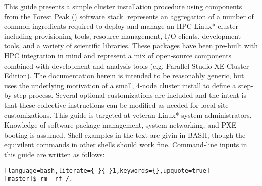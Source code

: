 This guide presents a simple cluster installation procedure using components
from the Forest Peak (\FSP{}) software stack. \FSP{} represents an aggregation of a number of
common ingredients required to deploy and manage an HPC Linux* cluster including
provisioning tools, resource management, I/O clients, development tools, and a variety of
scientific libraries. These packages have been pre-built with HPC integration
in mind and represent a mix of open-source components combined with \Intel{}
development and analysis tools (e.g. \Intel{} Parallel Studio XE Cluster Edition).
The documentation herein is intended to be reasonably generic, but uses the
underlying motivation of a small, 4-node cluster install to define a step-by-step
process. Several optional customizations are included and the intent is that
these collective instructions can be modified as needed for local site
customizations. This guide is targeted at veteran Linux* system administrators. Knowledge of 
software package management, system networking, and PXE booting is assumed. Shell 
examples in the text are givin in BASH, though the equivilent commands in other
shells should work fine. Command-line inputs in this guide are written as follows:

\begin{lstlisting}[language=bash,literate={-}{-}1,keywords={},upquote=true]
[master]$ rm -rf /.
\end{lstlisting}
